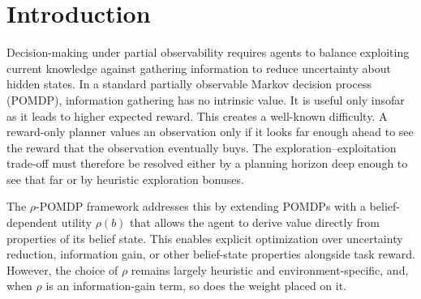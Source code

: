 \section{Introduction}

Decision-making under partial observability requires agents to balance exploiting current knowledge against gathering information to reduce uncertainty about hidden states. In a standard partially observable Markov decision process (POMDP), information gathering has no intrinsic value. It is useful only insofar as it leads to higher expected reward. This creates a well-known difficulty. A reward-only planner values an observation only if it looks far enough ahead to see the reward that the observation eventually buys. The exploration--exploitation trade-off must therefore be resolved either by a planning horizon deep enough to see that far or by heuristic exploration bonuses.

The $\rho$-POMDP framework \citep{araya2010} addresses this by extending POMDPs with a belief-dependent utility $\rho(b)$ that allows the agent to derive value directly from properties of its belief state. This enables explicit optimization over uncertainty reduction, information gain, or other belief-state properties alongside task reward. However, the choice of $\rho$ remains largely heuristic and environment-specific, and, when $\rho$ is an information-gain term, so does the weight placed on it.

